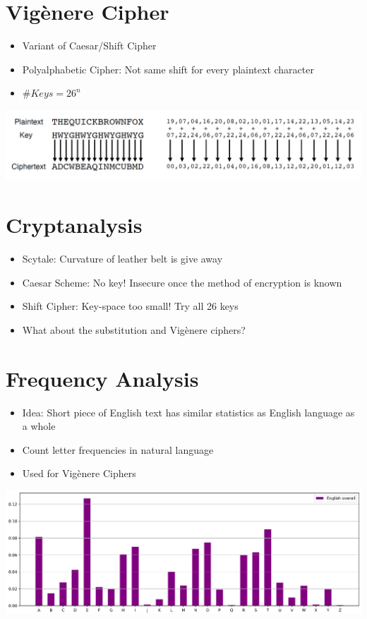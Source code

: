     \section{Vigènere Cipher}
    	\begin{itemize}
    		\item Variant of Caesar/Shift Cipher
    		\item Polyalphabetic Cipher: Not same shift for every plaintext character
    		\item $\# Keys = 26^n$
    	\end{itemize}
    	\begin{center}
          \includegraphics[width=140mm]{Graphics/Historical Ciphers/VigenereCipher.png}\newline
       \end{center}
	
	\section{Cryptanalysis}
		\begin{itemize}
			\item Scytale: Curvature of leather belt is give away
			\item Caesar Scheme: No key! Insecure once the method of encryption is known
			\item Shift Cipher: Key-space too small! Try all 26 keys
			\item What about the substitution and Vigènere ciphers?
		\end{itemize}
		
	\section{Frequency Analysis}
		\begin{itemize}
			\item Idea: Short piece of English text has similar statistics as English language as a whole
			\item Count letter frequencies in natural language
			\item Used for Vigènere Ciphers
		\end{itemize}
    	\begin{center}
         	 \includegraphics[width=180mm]{Graphics/Historical Ciphers/FrequencyAnalysis.png}\newline
       \end{center}
	
